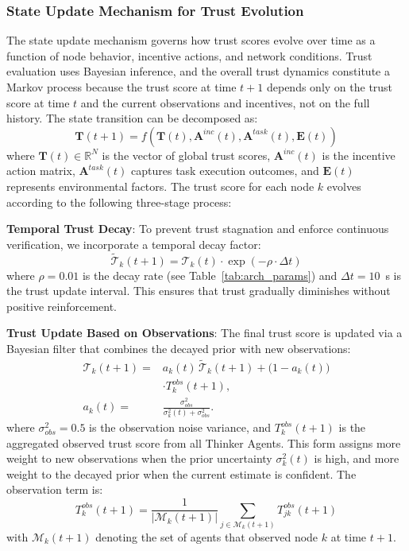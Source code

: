 \documentclass[notspecified,article,submit,moreauthors]{Definitions/mdpi}
\begin{document}
\subsubsection{State Update Mechanism for Trust Evolution}
\label{sec:state_update}
The state update mechanism governs how trust scores evolve over time as a function of node behavior, incentive actions, and network conditions. Trust evaluation uses Bayesian inference, and the overall trust dynamics constitute a Markov process because the trust score at time $t+1$ depends only on the trust score at time $t$ and the current observations and incentives, not on the full history. The state transition can be decomposed as:
\begin{equation}
\mathbf{T}(t+1) = f\left( \mathbf{T}(t), \mathbf{A}^{inc}(t), \mathbf{A}^{task}(t), \mathbf{E}(t) \right)
\end{equation}
where $\mathbf{T}(t) \in \mathbb{R}^N$ is the vector of global trust scores, $\mathbf{A}^{inc}(t)$ is the incentive action matrix, $\mathbf{A}^{task}(t)$ captures task execution outcomes, and $\mathbf{E}(t)$ represents environmental factors. The trust score for each node $k$ evolves according to the following three-stage process:

\textbf{Temporal Trust Decay}: To prevent trust stagnation and enforce continuous verification, we incorporate a temporal decay factor:
\begin{equation}\label{eq:decay}
\tilde{\mathcal{T}}_k(t+1) = \mathcal{T}_k(t) \cdot \exp\left(-\rho \cdot \Delta t\right)
\end{equation}
where $\rho = 0.01$ is the decay rate (see Table~\ref{tab:arch_params}) and $\Delta t = 10$~s is the trust update interval. This ensures that trust gradually diminishes without positive reinforcement.

\textbf{Trust Update Based on Observations}: The final trust score is updated via a Bayesian filter that combines the decayed prior with new observations:
\begin{equation}\label{eq:bayes_update}
\begin{aligned}
  \mathcal{T}_k(t+1) ={}& a_k(t)\,\tilde{\mathcal{T}}_k(t+1)
  + \bigl(1-a_k(t)\bigr)\\
  &\cdot T_k^{obs}(t+1),\\
  a_k(t) ={}& \frac{\sigma_{obs}^2}{\sigma_k^2(t)+\sigma_{obs}^2}.
\end{aligned}
\end{equation}
where $\sigma_{obs}^2 = 0.5$ is the observation noise variance, and $T_k^{obs}(t+1)$ is the aggregated observed trust score from all Thinker Agents. This form assigns more weight to new observations when the prior uncertainty $\sigma_k^2(t)$ is high, and more weight to the decayed prior when the current estimate is confident. The observation term is:
\begin{equation}\label{eq:obs_aggregation}
T_k^{obs}(t+1) = \frac{1}{|\mathcal{M}_k(t+1)|} \sum_{j \in \mathcal{M}_k(t+1)} T_{jk}^{obs}(t+1)
\end{equation}
with $\mathcal{M}_k(t+1)$ denoting the set of agents that observed node $k$ at time $t+1$.
\end{document}
